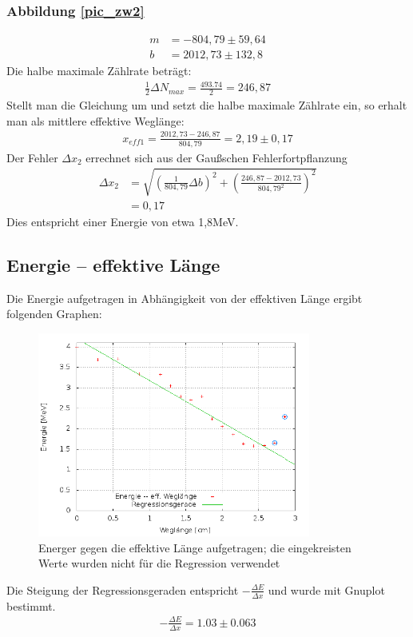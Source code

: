 \subsubsection{Abbildung \ref{pic_zw2}}
\begin{align*}
m&=-804,79 \pm 59,64\\
b&= 2012,73  \pm 132,8
\end{align*}
Die halbe maximale Zählrate beträgt:
\begin{align*}
 \frac{1}{2}\Delta N_{max} = \frac{493.74}{2} = 246,87
\end{align*}
Stellt man die Gleichung um und setzt die halbe maximale Zählrate ein, so erhalt man als mittlere effektive Weglänge:
\begin{align*}
x_{eff1}=\frac{2012,73-246,87}{804,79} = 2,19\pm0,17
\end{align*}
Der Fehler $\Delta x_2$ errechnet sich aus der Gaußschen Fehlerfortpflanzung
\begin{align*}
\Delta x_2&=\sqrt{\left(\frac{1}{804,79}\Delta b\right)^2+\left(\frac{246,87-2012,73}{804,79^2}\right)^2}\\ 
&= 0,17
\end{align*}
Dies entspricht einer Energie von etwa 1,8MeV.
\subsection{Energie -- effektive Länge}
Die Energie aufgetragen in Abhängigkeit von der effektiven Länge ergibt folgenden Graphen:

\begin{figure}[H]
\includegraphics[width=0.8\textwidth]{pics/energie_weglaenge.png}
\caption{Energer gegen die effektive Länge aufgetragen; die eingekreisten Werte wurden nicht für die Regression verwendet}
\end{figure}
Die Steigung der Regressionsgeraden entspricht $-\frac{\Delta E}{\Delta x}$ und wurde mit Gnuplot bestimmt.
\begin{align*}
-\frac{\Delta E}{\Delta x} = 1.03   \pm 0.063
\end{align*}
